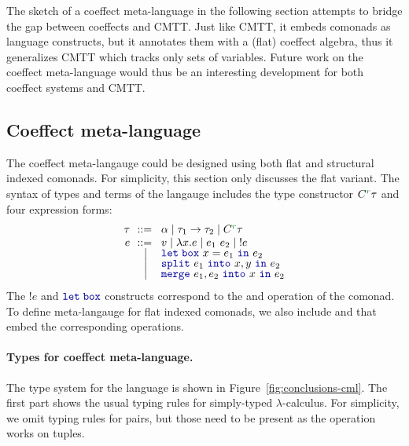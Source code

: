 The sketch of a coeffect meta-language in the following section attempts to bridge the gap
between coeffects and CMTT. Just like CMTT, it embeds comonads as language constructs, but
it annotates them with a (flat) coeffect algebra, thus it generalizes CMTT which tracks only
sets of variables. Future work on the coeffect meta-language would thus be an interesting 
development for both coeffect systems and CMTT.


\subsection{Coeffect meta-language}

The coeffect meta-langauge could be designed using both flat and structural indexed comonads.
For simplicity, this section only discusses the flat variant. The syntax of types and terms
of the langauge includes the type constructor $\ctyp{\cclrd{r}}{\tau}$ and four expression forms:
%
\begin{equation*}
\begin{array}{rcl}
 \tau &\narrow{::=}& \alpha \sep \tau_1 \rightarrow \tau_2 \sep \ctyp{\cclrd{r}}{\tau}\\
 e &\narrow{::=}& v \sep \lambda x.e \sep e_1~e_2 \sep !e    \\[-0.25em]
  &        \sep& \kvd{let\;box}~x=e_1~\kvd{in}~e_2           \\[-0.25em]
  &        \sep& \kvd{split}~e_1~\kvd{into}~x,y~\kvd{in}~e_2 \\[-0.25em]
  &        \sep& \kvd{merge}~e_1, e_2~\kvd{into}~x~\kvd{in}~e_2 
\end{array}
\end{equation*}
%
The $!e$ and $\kvd{let\;box}$ constructs correspond to the  and 
operation of the comonad. To define meta-langauge for flat indexed comonads, we also include 
 and  that embed the corresponding operations. 

\paragraph{Types for coeffect meta-language.}
The type system for the language is shown in Figure~\ref{fig:conclusions-cml}. The first part
shows the usual typing rules for simply-typed $\lambda$-calculus. For simplicity, we omit typing 
rules for pairs, but those need to be present as the  operation works on tuples.

